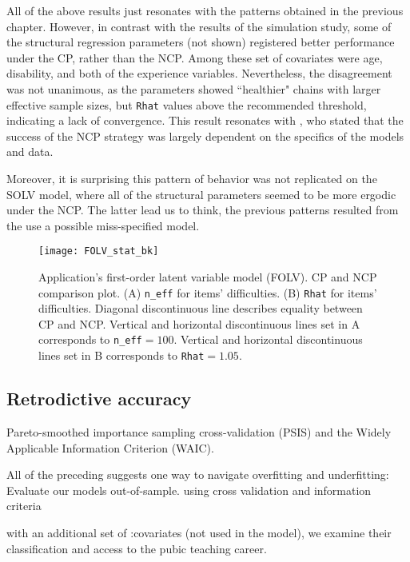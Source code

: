 All of the above results just resonates with the patterns obtained in the previous chapter. However, in contrast with the results of the simulation study, some of the structural regression parameters (not shown) registered better performance under the CP, rather than the NCP. Among these set of covariates were age, disability, and both of the experience variables. Nevertheless, the disagreement was not unanimous, as the parameters showed ``healthier" chains with larger effective sample sizes, but \texttt{Rhat} values above the recommended threshold, indicating a lack of convergence. This result resonates with \citet{Papaspiliopoulos_et_al_2007}, who stated that the success of the NCP strategy was largely dependent on the specifics of the models and data.

Moreover, it is surprising this pattern of behavior was not replicated on the SOLV model, where all of the structural parameters seemed to be more ergodic under the NCP. The latter lead us to think, the previous patterns resulted from the use a possible miss-specified model.
%
\begin{figure}[H]
	\centering
	\texttt{[image: FOLV\_stat\_bk]}
	\caption[Application's first-order latent variable model (FOLV). CP and NCP comparison plot.]%
	{Application's first-order latent variable model (FOLV). CP and NCP comparison plot. (A) \texttt{n\_eff} for items' difficulties. (B) \texttt{Rhat} for items' difficulties. Diagonal discontinuous line describes equality between CP and NCP. Vertical and horizontal discontinuous lines set in A corresponds to \texttt{n\_eff}$=100$. Vertical and horizontal discontinuous lines set in B corresponds to \texttt{Rhat}$=1.05$.}
	\label{fig:FOLV_stat1}
\end{figure}


\subsection{Retrodictive accuracy}

Pareto-smoothed importance sampling cross-validation (PSIS) and the  Widely Applicable Information Criterion (WAIC).

All of the preceding suggests one way to navigate overfitting and underfitting: Evaluate our models out-of-sample. using cross validation and information criteria


with an additional set of :covariates (not used in the model), we examine their classification and access to the pubic teaching career. 

